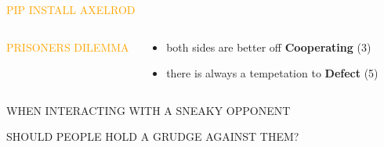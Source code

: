 \documentclass[usenames,dvipsnames,t]{beamer}
\begin{document}
\begin{frame}[fragile]

\begin{columns}
  \begin{column}{.45\linewidth}
   \vspace{1cm}


    {\fontsize{120}{130}\selectfont\textcolor{orange}{PIP \hspace{2cm} INSTALL \hspace{2cm} AXELROD}}

  \begin{columns}
  \begin{column}{.39\linewidth}

   \vspace{1cm}
    \textcolor{orange}{\LARGE{PRISONERS DILEMMA}}
  \end{column}
  \begin{column}{.55\linewidth}
    \large{
    \begin{itemize}
      \item both sides are better off \textbf{Cooperating} (3)
      \item there is always a tempetation to \textbf{Defect} (5)
    \end{itemize}
    }
    \end{column}
    \end{columns}
  \end{column}
  \begin{column}{.30\linewidth}

 \hspace{13cm}  
  \end{column}
  \end{columns}
  \begin{columns}
    \begin{column}{.25\linewidth}
   \vspace{1cm}

\begin{center}
\Large{\textcolor{red!80}{WHEN INTERACTING WITH A SNEAKY OPPONENT}}
\end{center}
\begin{center}
\Large{\textcolor{red!80}{SHOULD PEOPLE HOLD A GRUDGE AGAINST THEM?}}
\end{center}

\vspace{3cm}


\end{column}
\end{columns}
\end{frame}
\end{document}
